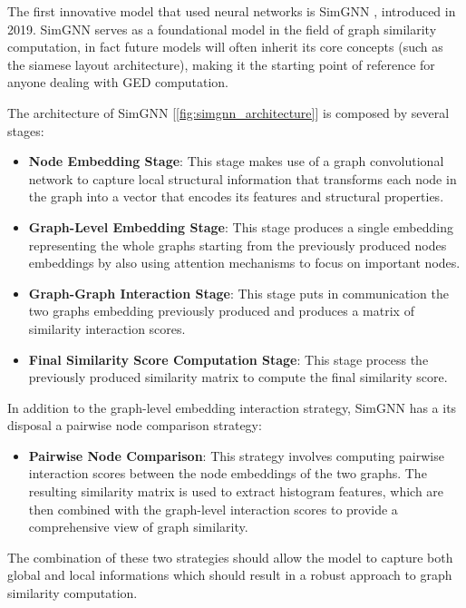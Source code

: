 \documentclass[../Thesis.tex]{subfiles}
\begin{document}
	The first innovative model that used neural networks is SimGNN \cite{simgnn__a_neural_network_approach_to_fast_graph_similarity_computation}, introduced in 2019. SimGNN serves as a foundational model in the field of graph similarity computation, in fact future models will often inherit its core concepts (such as the siamese layout architecture), making it the starting point of reference for anyone dealing with GED computation. 
	
	The architecture of SimGNN [\autoref{fig:simgnn_architecture}] is composed by several stages:
	
	\begin{itemize}
		\item \textbf{Node Embedding Stage}: This stage makes use of a graph convolutional network to capture local structural information that transforms each node in the graph into a vector that encodes its features and structural properties.
		\item \textbf{Graph-Level Embedding Stage}: This stage produces a single embedding representing the whole graphs starting from the previously produced nodes embeddings by also using attention mechanisms to focus on important nodes.
		\item \textbf{Graph-Graph Interaction Stage}: This stage puts in communication the two graphs embedding previously produced and produces a matrix of similarity interaction scores.
		\item \textbf{Final Similarity Score Computation Stage}: This stage process the previously produced similarity matrix to compute the final similarity score.
	\end{itemize}
	
	In addition to the graph-level embedding interaction strategy, SimGNN has a its disposal a pairwise node comparison strategy:
	
	\begin{itemize}
		\item \textbf{Pairwise Node Comparison}: This strategy involves computing pairwise interaction scores between the node embeddings of the two graphs. The resulting similarity matrix is used to extract histogram features, which are then combined with the graph-level interaction scores to provide a comprehensive view of graph similarity.
	\end{itemize}
	
	The combination of these two strategies should allow the model to capture both global and local informations which should result in a robust approach to graph similarity computation.
	
\end{document}
